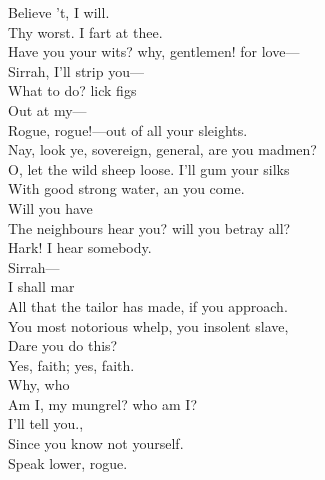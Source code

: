 \documentclass[a4paper,oneside]{memoir}
\begin{document}
\begin{drama*}


\act

\scene

\facespeaks Believe 't, I will.\\
\subtlespeaks {} Thy worst. I fart at thee.\\
\dolspeaks Have you your wits? why, gentlemen! for love---\\
\facespeaks Sirrah, I'll strip you---\\
\subtlespeaks {} What to do? lick figs\\
Out at my---\\
\facespeaks {} Rogue, rogue!---out of all your sleights.\\
\dolspeaks Nay, look ye, sovereign, general, are you madmen?\\
\subtlespeaks O, let the wild sheep loose. I'll gum your silks\\
With good strong water, an you come.\\
\dolspeaks {} Will you have\\
The neighbours hear you? will you betray all?\\
Hark! I hear somebody.\\
\facespeaks {} Sirrah---\\
\subtlespeaks {} I shall mar\\
All that the tailor has made, if you approach.\\
\facespeaks You most notorious whelp, you insolent slave,\\
Dare you do this?\\
\subtlespeaks {} Yes, faith; yes, faith.\\
\facespeaks {} Why, who\\
Am I, my mungrel? who am I?\\
\subtlespeaks {} I'll tell you.,\\
Since you know not yourself.\\
\facespeaks {} Speak lower, rogue.\\

\end{drama*}
\end{document}
